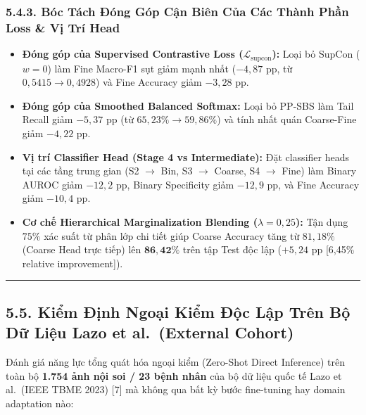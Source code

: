 \documentclass[
  10pt,
  a4paper,
  twocolumn]{article}
\providecommand{\tightlist}{%
  \setlength{\itemsep}{0pt}\setlength{\parskip}{0pt}}
\begin{document}
\subsubsection{5.4.3. Bóc Tách Đóng Góp Cận Biên Của Các Thành Phần Loss
\& Vị Trí
Head}\label{buxf3c-tuxe1ch-ux111uxf3ng-guxf3p-cux1eadn-biuxean-cux1ee7a-cuxe1c-thuxe0nh-phux1ea7n-loss-vux1ecb-truxed-head}

\begin{itemize}
\tightlist
\item
  \textbf{Đóng góp của Supervised Contrastive Loss
  (\(\mathcal{L}_{\text{supcon}}\)):} Loại bỏ SupCon (\(w=0\)) làm Fine
  Macro-F1 sụt giảm mạnh nhất (\(-4{,}87\) pp, từ
  \(0{,}5415 \to 0{,}4928\)) và Fine Accuracy giảm \(-3{,}28\) pp.
\item
  \textbf{Đóng góp của Smoothed Balanced Softmax:} Loại bỏ PP-SBS làm
  Tail Recall giảm \(-5{,}37\) pp (từ \(65{,}23\% \to 59{,}86\%\)) và
  tính nhất quán Coarse-Fine giảm \(-4{,}22\) pp.
\item
  \textbf{Vị trí Classifier Head (Stage 4 vs Intermediate):} Đặt
  classifier heads tại các tầng trung gian (S2 \(\to\) Bin, S3 \(\to\)
  Coarse, S4 \(\to\) Fine) làm Binary AUROC giảm \(-12{,}2\) pp, Binary
  Specificity giảm \(-12{,}9\) pp, và Fine Accuracy giảm \(-10{,}4\) pp.
\item
  \textbf{Cơ chế Hierarchical Marginalization Blending
  (\(\lambda=0{,}25\)):} Tận dụng \(75\%\) xác suất từ phân lớp chi tiết
  giúp Coarse Accuracy tăng từ \(81{,}18\%\) (Coarse Head trực tiếp) lên
  \(\mathbf{86{,}42\%}\) trên tập Test độc lập (\(+5{,}24\) pp {[}6,45\%
  relative improvement{]}).
\end{itemize}

\begin{center}\rule{0.5\linewidth}{0.5pt}\end{center}

\subsection{5.5. Kiểm Định Ngoại Kiểm Độc Lập Trên Bộ Dữ Liệu Lazo et
al.~(External
Cohort)}\label{kiux1ec3m-ux111ux1ecbnh-ngoux1ea1i-kiux1ec3m-ux111ux1ed9c-lux1eadp-truxean-bux1ed9-dux1eef-liux1ec7u-lazo-et-al.-external-cohort}

Đánh giá năng lực tổng quát hóa ngoại kiểm (Zero-Shot Direct Inference)
trên toàn bộ \textbf{1.754 ảnh nội soi / 23 bệnh nhân} của bộ dữ liệu
quốc tế Lazo et al.~(IEEE TBME 2023) {[}7{]} mà không qua bất kỳ bước
fine-tuning hay domain adaptation nào:
\end{document}
